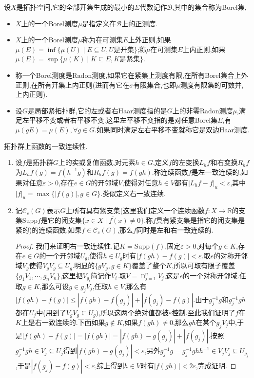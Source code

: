 设$X$是拓扑空间,它的全部开集生成的最小的$\Sigma$代数记作$\mathscr{B}$,其中的集合称为Borel集,
\begin{itemize}
	\item $X$上的一个Borel测度$\mu$是指定义在$\mathscr{B}$上的正测度.
	\item $X$上的一个Borel测度$\mu$称为在可测集$E$上外正则,如果$\mu(E)=\inf\{\mu(U)\mid E\subseteq U,U\text{是开集}\}$;称$\mu$在可测集$E$上内正则,如果$\mu(E)=\sup\{\mu(K)\mid K\subseteq E,K\text{是紧集}\}$.
	\item 称一个Borel测度是Radon测度,如果它在紧集上测度有限,在所有Borel集合上外正则,在所有开集上内正则(进而有它在$\sigma$有限集合,也即$\mu$测度有限集的可数并,上内正则).
	\item 设$G$是局部紧拓扑群,它的左或者右Haar测度指的是$G$上的非零Radon测度$\mu$,满足左平移不变或者右平移不变.这里左平移不变指的是对任意Borel集$E$,有$\mu(gE)=\mu(E),\forall g\in G$.如果同时满足左右平移不变就称它是双边Haar测度.
\end{itemize}

拓扑群上函数的一致连续性.
\begin{enumerate}
	\item 设$f$是拓扑群$G$上的实或复值函数,对元素$h\in G$,定义$f$的左变换$L_hf$和右变换$R_hf$为$L_hf(g)=f(h^{-1}g)$和$R_hf(g)=f(gh)$.称连续函数$f$是左一致连续的,如果对任意$\varepsilon>0$,存在$e\in G$的开邻域$V$,使得对任意$h\in V$都有$|L_hf-f|_u<\varepsilon$,其中$|f|_u=\max\{|f(g)|,g\in G\}$.类似定义右一致连续.
	\item 记$\mathscr{C}_c(G)$表示$G$上所有具有紧支集(这里我们定义一个连续函数$f:X\to\mathbb{R}$的支集$\mathrm{Supp}f$是它的闭支集$\overline{\{x\in X\mid f(x)\not=0\}}$,称$f$具有紧支集是指它的闭支集是紧的)的连续函数.如果$f\in\mathscr{C}_c(G)$,那么$f$同时是左和右一致连续的.
	\begin{proof}
		
		我们来证明右一致连续性.记$K=\mathrm{Supp}(f)$,固定$\varepsilon>0$,对每个$g\in K$,存在$e\in G$的一个开邻域$U_g$,使得$h\in U_g$时有$|f(gh)-f(g)|<\varepsilon$.取$e$的对称开邻域$V_g$使得$V_gV_g\subseteq U_g$.明显的$\{gV_g,g\in K\}$覆盖了整个$K$,所以可取有限子覆盖$\{g_1V_1,\cdots,g_nV_n\}$,这里把$V_{g_i}$简记作$V_i$.取$V=\cap_{j=1}^nV_j$,这是$e$的一个对称开邻域.任取$g\in K$,那么可设$g\in g_jV_j$,任取$h\in V$,那么有$|f(gh)-f(g)|\le|f(gh)-f(g_j)|+|f(g_j)-f(g)|$.由于$g_j^{-1}g$和$g_j^{-1}gh$都在$U_j$中(用到了$V_gV_g\subseteq U_g$),所以这两个绝对值都被$\varepsilon$控制.至此我们证明了$f$在$K$上是右一致连续的.下面如果$g\not\in K$,如果$f(gh)\not=0$,那么$gh$在某个$g_jV_j$中,于是$|f(gh)-f(g)|=|f(gh)|=|f(gh)-g(g_j)|+|f(g_j)|$.按照$g_j^{-1}gh\in V_j\subseteq U_j$得到$|f(gh)-g(g_j)|<\varepsilon$,另外$g_j^{-1}g=g_j^{-1}ghh^{-1}\in V_jV_j\subseteq U_{g_j}$,于是$|f(g_j)-f(g)|<\varepsilon$,综上得到$h\in V$时有$|f(gh)|<2\varepsilon$,完成证明.
	\end{proof}
\end{enumerate}

